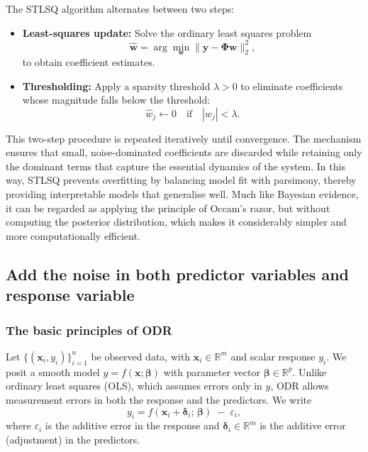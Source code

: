 The STLSQ algorithm alternates between two steps:
\begin{itemize}
    \item \textbf{Least-squares update:} Solve the ordinary least squares problem
    \begin{equation}
\hat{\boldsymbol{w}} = \arg\min_{\boldsymbol{w}} \|\boldsymbol{y} - \mathbf{\Phi} \boldsymbol{w}\|_2^2,
\end{equation}
to obtain coefficient estimates.
    \item \textbf{Thresholding:} Apply a sparsity threshold $\lambda > 0$ to eliminate coefficients whose magnitude falls below the threshold:
\begin{equation}
\hat{w}_j \leftarrow 0 \quad \text{if} \quad |\hat{w}_j| < \lambda.
\end{equation}
\end{itemize}

This two-step procedure is repeated iteratively until convergence. The mechanism ensures that small, noise-dominated coefficients are discarded while retaining only the dominant terms that capture the essential dynamics of the system. 
In this way, STLSQ prevents overfitting by balancing model fit with parsimony, thereby providing interpretable models that generalise well. Much like Bayesian evidence, it can be regarded as applying the principle of Occam’s razor, but without computing the posterior distribution, which makes it considerably simpler and more computationally efficient.



\subsection{Add the noise in both predictor variables and response variable}
\label{subsec:noise_xy}

\subsubsection{The basic principles of ODR}
Let $\{(\boldsymbol{x}_i,y_i)\}_{i=1}^n$ be observed data, with $\boldsymbol{x}_i\in\mathbb{R}^m$ and scalar response $y_i$.
We posit a smooth model $y = f(\boldsymbol{x};\boldsymbol{\beta})$ with parameter vector $\boldsymbol{\beta}\in\mathbb{R}^p$.
Unlike ordinary least squares (OLS), which assumes errors only in $y$, ODR allows measurement errors in both the response and the predictors. We write
\begin{equation}
    y_i = f(\boldsymbol{x}_i+\boldsymbol{\delta}_i;\,\boldsymbol{\beta})\;-\;\varepsilon_i,
\end{equation}
where $\varepsilon_i$ is the additive error in the response and $\boldsymbol{\delta}_i\in\mathbb{R}^m$ is the additive error (adjustment) in the predictors.


